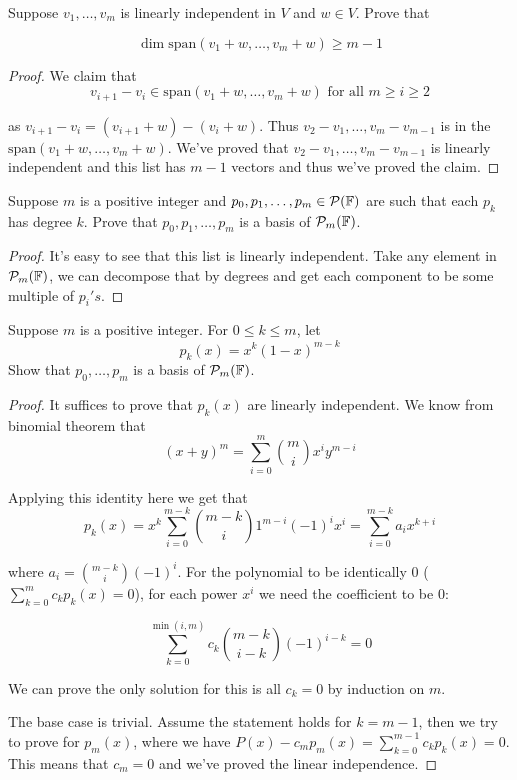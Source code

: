 \documentclass{extarticle}
\begin{document}
\begin{problem}{8}
    Suppose \(v_1, \ldots, v_m\) is linearly independent in \(V\) and \(w \in V\). Prove that 

    \[\dim \text{span} (v_1 + w, \ldots, v_m + w) \geq m - 1\]
\end{problem}

\begin{proof}
We claim that 
\[v_{i+1} - v_i \in \text{span}(v_1 + w, \ldots, v_m + w) \text{ for all } m \geq i \geq 2\]

as \(v_{i+1} - v_i = (v_{i+1} + w) - (v_i + w)\). Thus \(v_2 - v_1, \ldots, v_m - v_{m-1}\) is 
in the \(\text{span}(v_1 + w, \ldots, v_m + w)\). We've proved that \(v_2 - v_1, \ldots, v_m - v_{m-1}\)
is linearly independent and this list has \(m - 1\) vectors and thus we've proved the claim.
\end{proof}

\begin{problem}{9}
    Suppose \(m\) is a positive integer and \(p_0, p_1, \ldots, p_m \in \mathcal{P}(\mathbb{F})\) are 
    such that each \(p_k\) has degree \(k\). Prove that \(p_0, p_1, \ldots, p_m\) 
    is a basis of \(\mathcal{P}_m (\mathbb{F})\).
\end{problem}

\begin{proof}
It's easy to see that this list is linearly independent. Take any element in \(\mathcal{P}_m (\mathbb{F})\),
we can decompose that by degrees and get each component to be some multiple of \(p_i's\).
\end{proof}

\begin{problem}{10}
    Suppose \(m\) is a positive integer. For \(0 \leq k \leq m\), let 
    \[p_k(x) = x^k (1 - x)^{m - k}\]
    Show that \(p_0, \ldots, p_m\) is a basis of \(\mathcal{P}_m(\mathbb{F})\). 
\end{problem}

\begin{proof}
It suffices to prove that \(p_k(x)\) are linearly independent. We know from binomial theorem 
that 
\[(x+y)^m = \sum_{i=0}^{m} \binom{m}{i} x^i y^{m-i} \]

Applying this identity here we get that 
\[p_k(x) = x^k \sum_{i=0}^{m-k} \binom{m-k}{i} 1^{m-i} (-1)^{i} x^{i} = \sum_{i=0}^{m-k}
a_i x^{k + i}\]

where \(a_i = \binom{m-k}{i} (-1)^i\). For the polynomial to be identically 0 (\(\sum_{k=0}^{m}c_k p_k (x) = 0\)), 
for each power \(x^i\) we need the coefficient to be 0:

\[\sum_{k=0}^{\min(i, m)} c_k \binom{m-k}{i-k} (-1)^{i - k} = 0\]

We can prove the only solution for this is all \(c_k = 0\) by induction on \(m\). 

The base case is trivial. Assume the statement holds for \(k = m - 1\), then we try 
to prove for \(p_m(x)\), where we have \(P(x) - c_m p_m (x) = \sum_{k=0}^{m-1}c_kp_k(x)=0\). 
This means that \(c_m = 0\) and we've proved the linear independence. 
\end{proof}
\end{document}
